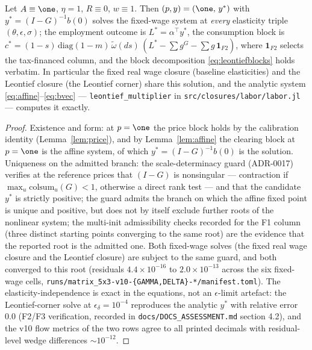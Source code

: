 \begin{proposition}\label{prop:gd}
Let $A \equiv \one$, $\eta = 1$, $R \equiv 0$, $w \equiv 1$. Then
$(p,y) = (\one,\, y^{\ast})$ with
$y^{\ast} = (I - G)^{-1} b(0)$ solves the fixed-wage system at
\emph{every} elasticity triple $(\theta,\epsilon,\sigma)$; the employment
outcome is $L^{\ast} = \alpha^{\!\top} y^{\ast}$, the consumption block is
$c^{\ast} = (1-s)\,\mathrm{diag}(1-m)\,\tilde\omega(ds)\,
(L^{\ast} - \sum g^G - \sum g\,\mathbf{1}_{F2})$, where
$\mathbf{1}_{F2}$ selects the tax-financed column, and the block
decomposition \eqref{eq:leontiefblocks} holds verbatim. In particular the
fixed real wage closure (baseline
elasticities) and the Leontief closure (the Leontief corner) share this
solution, and the
analytic system \eqref{eq:affine}--\eqref{eq:bvec} ---
\texttt{leontief\_multiplier} in \texttt{src/closures/labor/labor.jl} ---
computes it exactly.
\end{proposition}

\begin{proof}
Existence and form: at $p = \one$ the price block holds by the calibration
identity (Lemma~\ref{lem:price}), and by Lemma~\ref{lem:affine} the
clearing block at $p = \one$ is the affine system, of which
$y^{\ast} = (I-G)^{-1}b(0)$ is the solution. Uniqueness on the admitted
branch: the scale-determinacy guard (ADR-0017) verifies at the reference
prices that $(I - G)$ is nonsingular --- contraction if
$\max_u \mathrm{colsum}_u(G) < 1$, otherwise a direct rank test --- and
that the candidate $y^{\ast}$ is strictly positive;
the guard admits the branch on which the affine fixed
point is unique and positive, but does not by itself exclude further roots of
the nonlinear system; the multi-init admissibility checks recorded for the F1
column (three distinct starting points converging to the same root) are the
evidence that the reported root is the admitted one. Both fixed-wage solves
(the fixed real wage closure and the Leontief closure) are subject to the
same guard, and both converged to this root
(residuals $4.4\times10^{-16}$ to $2.0\times10^{-13}$
across the six fixed-wage cells,
\texttt{runs/matrix\_5x3-v10-\{GAMMA,DELTA\}-*/manifest.toml}). The
elasticity-independence is exact in the equations, not an $\epsilon$-limit
artefact: the Leontief-corner solve at $\epsilon_\delta = 10^{-4}$
reproduces the
analytic $y^{\ast}$ with relative error $0.0$ (F2/F3 verification, recorded
in \texttt{docs/DOCS\_ASSESSMENT.md} section 4.2), and the v10 flow metrics
of the two rows agree to all printed decimals with residual-level wedge
differences $\sim 10^{-12}$.
\end{proof}

